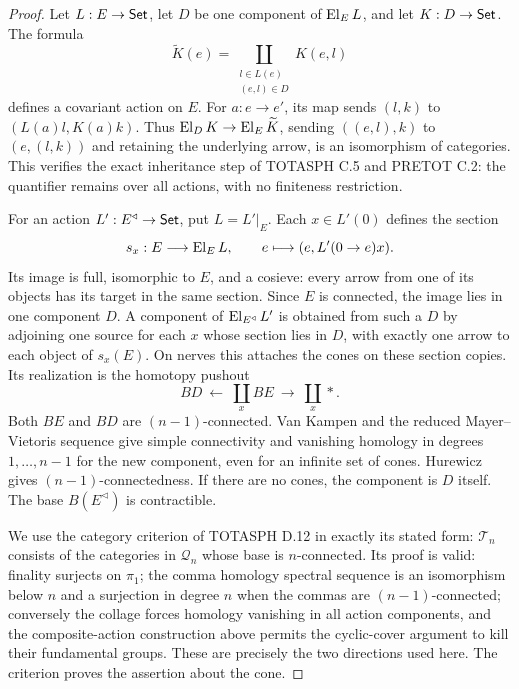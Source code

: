 \begin{proof}
Let $L:E\to\mathsf{Set}$, let $D$ be one component of $\operatorname{El}_E L$, and let $K:D\to\mathsf{Set}$. The formula
\[
 \widetilde K(e)=\coprod_{\substack{l\in L(e)\\(e,l)\in D}}K(e,l)
\]
defines a covariant action on $E$. For $a:e\to e'$, its map sends $(l,k)$ to $(L(a)l,K(a)k)$. Thus $\operatorname{El}_DK\to\operatorname{El}_E\widetilde K$, sending $((e,l),k)$ to $(e,(l,k))$ and retaining the underlying arrow, is an isomorphism of categories. This verifies the exact inheritance step of TOTASPH C.5 and PRETOT C.2: the quantifier remains over all actions, with no finiteness restriction.

For an action $L':E^{\triangleleft}\to\mathsf{Set}$, put $L=L'|_E$. Each $x\in L'(0)$ defines the section
\[
 s_x:E\longrightarrow\operatorname{El}_E L,\qquad e\longmapsto(e,L'(0\to e)x).
\]
Its image is full, isomorphic to $E$, and a cosieve: every arrow from one of its objects has its target in the same section. Since $E$ is connected, the image lies in one component $D$. A component of $\operatorname{El}_{E^{\triangleleft}}L'$ is obtained from such a $D$ by adjoining one source for each $x$ whose section lies in $D$, with exactly one arrow to each object of $s_x(E)$. On nerves this attaches the cones on these section copies. Its realization is the homotopy pushout
\[
 BD\ \longleftarrow\ \coprod_x BE\ \longrightarrow\ \coprod_x *.
\]
Both $BE$ and $BD$ are $(n-1)$-connected. Van Kampen and the reduced Mayer--Vietoris sequence give simple connectivity and vanishing homology in degrees $1,\ldots,n-1$ for the new component, even for an infinite set of cones. Hurewicz gives $(n-1)$-connectedness. If there are no cones, the component is $D$ itself. The base $B(E^{\triangleleft})$ is contractible.

We use the category criterion of TOTASPH D.12 in exactly its stated form: $\mathcal T_n$ consists of the categories in $\mathcal Q_n$ whose base is $n$-connected. Its proof is valid: finality surjects on $\pi_1$; the comma homology spectral sequence is an isomorphism below $n$ and a surjection in degree $n$ when the commas are $(n-1)$-connected; conversely the collage forces homology vanishing in all action components, and the composite-action construction above permits the cyclic-cover argument to kill their fundamental groups. These are precisely the two directions used here. The criterion proves the assertion about the cone.
\end{proof}

